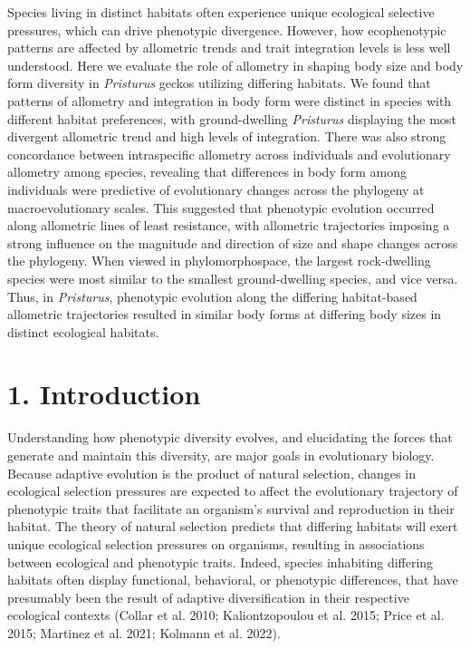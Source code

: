 \documentclass[
  11pt,
]{article}
\begin{document}
Species living in distinct habitats often experience unique ecological
selective pressures, which can drive phenotypic divergence. However, how
ecophenotypic patterns are affected by allometric trends and trait
integration levels is less well understood. Here we evaluate the role of
allometry in shaping body size and body form diversity in
\emph{Pristurus} geckos utilizing differing habitats. We found that
patterns of allometry and integration in body form were distinct in
species with different habitat preferences, with ground-dwelling
\emph{Pristurus} displaying the most divergent allometric trend and high
levels of integration. There was also strong concordance between
intraspecific allometry across individuals and evolutionary allometry
among species, revealing that differences in body form among individuals
were predictive of evolutionary changes across the phylogeny at
macroevolutionary scales. This suggested that phenotypic evolution
occurred along allometric lines of least resistance, with allometric
trajectories imposing a strong influence on the magnitude and direction
of size and shape changes across the phylogeny. When viewed in
phylomorphospace, the largest rock-dwelling species were most similar to
the smallest ground-dwelling species, and vice versa. Thus, in
\emph{Pristurus}, phenotypic evolution along the differing habitat-based
allometric trajectories resulted in similar body forms at differing body
sizes in distinct ecological habitats.

\newpage

\hypertarget{introduction}{%
\section{1. Introduction}\label{introduction}}

Understanding how phenotypic diversity evolves, and elucidating the
forces that generate and maintain this diversity, are major goals in
evolutionary biology. Because adaptive evolution is the product of
natural selection, changes in ecological selection pressures are
expected to affect the evolutionary trajectory of phenotypic traits that
facilitate an organism's survival and reproduction in their habitat. The
theory of natural selection predicts that differing habitats will exert
unique ecological selection pressures on organisms, resulting in
associations between ecological and phenotypic traits. Indeed, species
inhabiting differing habitats often display functional, behavioral, or
phenotypic differences, that have presumably been the result of adaptive
diversification in their respective ecological contexts (Collar et al.
2010; Kaliontzopoulou et al. 2015; Price et al. 2015; Martinez et al.
2021; Kolmann et al. 2022). \hfill\break
\end{document}
